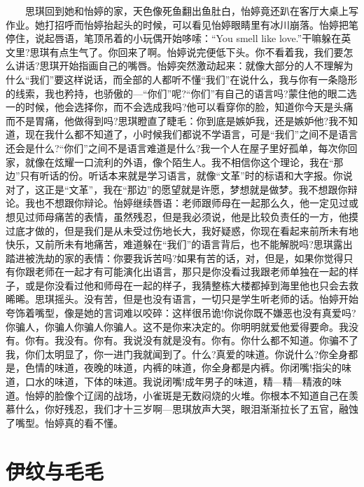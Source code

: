 \documentclass[12pt,UTF8]{ctexbook}
\begin{document}
　　思琪回到她和怡婷的家，天色像死鱼翻出鱼肚白，怡婷竟还趴在客厅大桌上写作业。她打招呼而怡婷抬起头的时候，可以看见怡婷眼睛里有冰川崩落。怡婷把笔停住，说起唇语，笔顶吊着的小玩偶开始哆嗦：\enquote{You smell like love.}干嘛躲在英文里?思琪有点生气了。你回来了啊。怡婷说完便低下头。你不看着我，我们要怎么讲话?思琪开始指画自己的嘴唇。怡婷突然激动起来：就像大部分的人不理解为什么\enquote{我们}要这样说话，而全部的人都听不懂\enquote{我们}在说什么，我与你有一条隐形的线索，我也矜持，也骄傲的---\enquote{你们}呢?\enquote{你们}有自己的语言吗?蒙住他的眼二选一的时候，他会选择你，而不会选成我吗?他可以看穿你的脸，知道你今天是头痛而不是胃痛，他做得到吗?思琪瞪直了睫毛：你到底是嫉妒我，还是嫉妒他?我不知道，现在我什么都不知道了，小时候我们都说不学语言，可是\enquote{我们}之间不是语言还会是什么?\enquote{你们}之间不是语言难道是什么?我一个人在屋子里好孤单，每次你回家，就像在炫耀一口流利的外语，像个陌生人。我不相信你这个理论，我在\enquote{那边}只有听话的份。听话本来就是学习语言，就像\enquote{文革}时的标语和大字报。你说对了，这正是\enquote{文革}，我在\enquote{那边}的愿望就是许愿，梦想就是做梦。我不想跟你辩论。我也不想跟你辩论。怡婷继续唇语：老师跟师母在一起那么久，他一定见过或想见过师母痛苦的表情，虽然残忍，但是我必须说，他是比较负责任的一方，他摸过底才做的，但是我们是从未受过伤地长大，我好疑惑，你现在看起来前所未有地快乐，又前所未有地痛苦，难道躲在\enquote{我们}的语言背后，也不能解脱吗?思琪露出踏进被洗劫的家的表情：你要我诉苦吗?如果有苦的话，对，但是，如果你觉得只有你跟老师在一起才有可能演化出语言，那只是你没看过我跟老师单独在一起的样子，或是你没看过他和师母在一起的样子，我猜整栋大楼都掉到海里他也只会去救晞晞。思琪摇头。没有苦，但是也没有语言，一切只是学生听老师的话。怡婷开始夸饰着嘴型，像是她的言词难以咬碎：这样很吊诡!你说你既不嫌恶也没有真爱吗?你骗人，你骗人你骗人你骗人。这不是你来决定的。你明明就爱他爱得要命。我没有。你有。我没有。你有。我说没有就是没有。你有。你什么都不知道。你骗不了我，你们太明显了，你一进门我就闻到了。什么?真爱的味道。你说什么?你全身都是，色情的味道，夜晚的味道，内裤的味道，你全身都是内裤。你闭嘴!指尖的味道，口水的味道，下体的味道。我说闭嘴!成年男子的味道，精---精---精液的味道。怡婷的脸像个辽阔的战场，小雀斑是无数闷烧的火堆。你根本不知道自己在羡慕什么，你好残忍，我们才十三岁啊---思琪放声大哭，眼泪渐渐拉长了五官，融蚀了嘴型。怡婷真的看不懂。

\hypertarget{ux4f0aux7eb9ux4e0eux6bdbux6bdb}{%
\section*{伊纹与毛毛}\label{ux4f0aux7eb9ux4e0eux6bdbux6bdb}}
\end{document}
